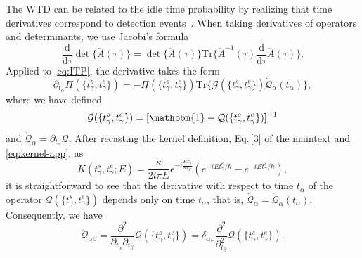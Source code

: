 \documentclass[aps,prl,amsmath,twocolumn,floatfix,superscriptaddress,longbibliography,footinbib]{revtex4-1}
\begin{document}
The WTD can be related to the idle time probability by realizing that time derivatives correspond to detection events~\cite{Haack2014}. When taking derivatives of operators and determinants, we use Jacobi's formula
\begin{equation}
	\frac{\mathrm{d}}{\mathrm{d}\tau} \det\{\check{A}(\tau)\} = \det\{\check{A}(\tau)\} \mathrm{Tr} \{\check{A}^{-1}(\tau) \frac{\mathrm{d}}{\mathrm{d}\tau} \check{A}(\tau)\} .
	\label{eq:Jacobi}
\end{equation}
Applied to \cref{eq:ITP}, the derivative takes the form
\begin{equation}
	\partial_{t_\alpha} \Pi(\{t^{s}_\gamma, t^{e}_\gamma\}) = - \Pi(\{t^{s}_\gamma, t^{e}_\gamma\}) \mathrm{Tr} \{ \mathcal{G}(\{t^{s}_\gamma, t^{e}_\gamma\})  \dot{\mathcal{Q}}_\alpha (t_\alpha) \} ,
	\label{eq:deriv}
\end{equation}
where we have defined 
\begin{equation}
	\mathcal{G}(\{t^{s}_\gamma, t^{e}_\gamma\})= [\mathbbm{1} - \mathcal{Q}(\{t^{s}_\gamma, t^{e}_\gamma\}) ]^{-1}
\end{equation}
and $ \dot{\mathcal{Q}}_\alpha = \partial_{t_\alpha} \mathcal{Q} $. After recasting the kernel definition, Eq.\,[3] of the maintext and \cref{eq:kernel-app}, as 
\begin{equation}
	K(t^{s}_\gamma, t^{e}_\gamma; E)
	=\frac{\kappa}{2 i \pi E} e^{-i \frac{E x_\gamma}{\hbar v_F} }
	\left( e^{-i E t^{e}_\gamma/\hbar } - e^{-i E t^{s}_\gamma / \hbar } \right),
	\label{eq:kernel2}
\end{equation}
it is straightforward to see that the derivative with respect to time $t_\alpha$ of the operator $\mathcal{Q}(\{t^{s}_\gamma, t^{e}_\gamma\}) $ depends only on time $t_\alpha$, that is, $ \dot{\mathcal{Q}}_\alpha = \dot{\mathcal{Q}}_\alpha (t_\alpha) $. Consequently, we have 
\begin{equation}
	\ddot{\mathcal{Q}}_{\alpha\beta} = \frac{\partial^2}{\partial_{t_\alpha} \partial_{t_\beta}}\mathcal{Q}(\{t^{s}_\gamma, t^{e}_\gamma\}) = \delta_{\alpha\beta} \frac{\partial^2}{\partial_{t_\beta}^2}\mathcal{Q}(\{t^{s}_\gamma, t^{e}_\gamma\}) . 
	\label{eq:dob-der}
\end{equation}
\end{document}
